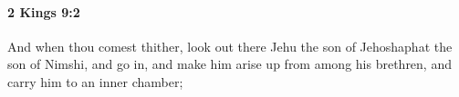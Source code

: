 
		\paragraph{2 Kings 9:2} %
			\label{2KINGS-9-2}

			And when thou comest thither, look out there Jehu the son of Jehoshaphat the son of Nimshi, and go in, and make him arise up from among his brethren, and carry him to an inner chamber;


